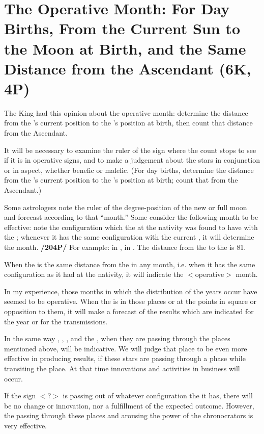 \section{The Operative Month: For Day Births, From the Current Sun to the Moon at Birth, and the Same Distance from the Ascendant (6K, 4P)}

The King had this opinion about the operative month: determine the distance from the \Sun’s current position to the \Moon’s position at birth, then count that distance from the Ascendant. 

It will be necessary to examine the ruler of the sign where the count stops to see if it is in operative signs, and to make a judgement about the stars in conjunction or in aspect, whether benefic or malefic. (For day births, determine the distance from the \Moon’s current position to the \Sun’s position at birth; count that from the Ascendant.)

Some astrologers note the ruler of the degree-position of the new or full moon and forecast according to that “month.” Some consider the following month to be effective: note the configuration which the \Moon\xspace at the nativity was found to have with the \Sun; whenever it has the same configuration with the current \Sun,
it will determine the month. \textbf{/204P/} For example: \Sun\xspace in \Leo\xspace 5\deg, \Moon\xspace in \Libra\xspace 2\deg. The distance from
the \Sun\xspace to the \Moon\xspace is 81\deg. 

When the \Moon\xspace is the same distance from the \Sun\xspace in any month, i.e. when it has the same configuration as it had at the nativity, it will indicate the $<$operative$>$ month.

In my experience, those months in which the distribution of the years occur have seemed to be operative. When the \Sun\xspace is in those places or at the points in square or opposition to them, it will make a
forecast of the results which are indicated for the year or for the transmissions. 

In the same way \Mars, \Venus, \Mercury, and the \Moon, when they are passing through the places mentioned above, will be indicative. We will judge that place to be even more effective in producing results, if these stars are passing through a phase while transiting the place. At that time innovations and activities in business will occur. 

If the sign $<$?$>$ is passing out of whatever configuration the it has, there will be no change or innovation, nor a fulfillment of the expected outcome. However, the \Sun\xspace passing through these places and
arousing the power of the chronocrators is very effective.



\newpage